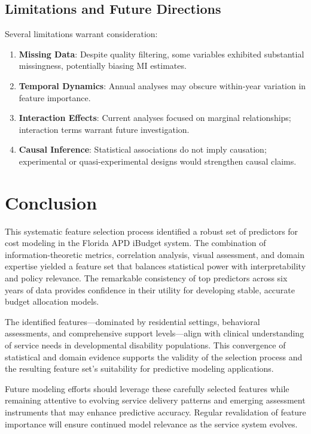 \subsection{Limitations and Future Directions}
\label{subsec:limitations}

Several limitations warrant consideration:

\begin{enumerate}
    \item \textbf{Missing Data}: Despite quality filtering, some variables exhibited substantial missingness, potentially biasing MI estimates.
    
    \item \textbf{Temporal Dynamics}: Annual analyses may obscure within-year variation in feature importance.
    
    \item \textbf{Interaction Effects}: Current analyses focused on marginal relationships; interaction terms warrant future investigation.
    
    \item \textbf{Causal Inference}: Statistical associations do not imply causation; experimental or quasi-experimental designs would strengthen causal claims.
\end{enumerate}

\section{Conclusion}
\label{sec:feature-selection-conclusion}

This systematic feature selection process identified a robust set of predictors for cost modeling in the Florida APD iBudget system. The combination of information-theoretic metrics, correlation analysis, visual assessment, and domain expertise yielded a feature set that balances statistical power with interpretability and policy relevance. The remarkable consistency of top predictors across six years of data provides confidence in their utility for developing stable, accurate budget allocation models.

The identified features—dominated by residential settings, behavioral assessments, and comprehensive support levels—align with clinical understanding of service needs in developmental disability populations. This convergence of statistical and domain evidence supports the validity of the selection process and the resulting feature set's suitability for predictive modeling applications.

Future modeling efforts should leverage these carefully selected features while remaining attentive to evolving service delivery patterns and emerging assessment instruments that may enhance predictive accuracy. Regular revalidation of feature importance will ensure continued model relevance as the service system evolves.